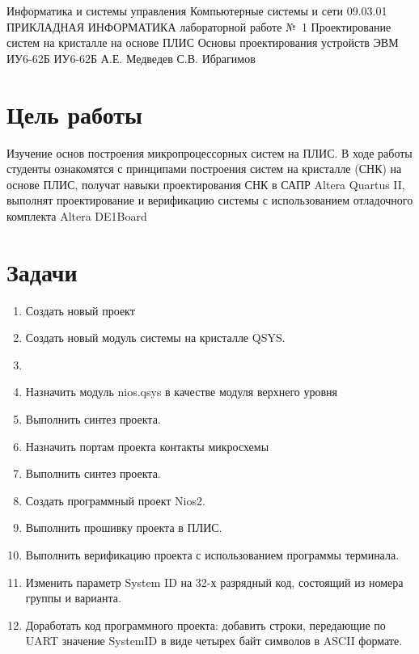 \documentclass{bmstu}
\begin{document}



\makereporttitle
    {Информатика и системы управления} %
    {Компьютерные системы и сети} %
    {09.03.01 ПРИКЛАДНАЯ ИНФОРМАТИКА} %
    {лабораторной работе №~1} %
    {Проектирование систем на кристалле на основе ПЛИС} %
    {Основы проектирования устройств ЭВМ} %
    {} %
    {ИУ6-62Б} %
    {
    	{ИУ6-62Б}
    	{А.Е. Медведев} %
    	{С.В. Ибрагимов} %
    } 

\section*{Цель работы}
Изучение основ построения микропроцессорных систем на ПЛИС. В ходе работы студенты
ознакомятся с принципами построения систем на кристалле (СНК) на основе ПЛИС, получат
навыки проектирования СНК в САПР Altera Quartus II, выполнят проектирование и
верификацию системы с использованием отладочного комплекта Altera DE1Board

\section*{Задачи}
\begin{enumerate}
\item Создать новый проект
\item Создать новый модуль системы на кристалле QSYS.
\item {}
\item Назначить модуль nios.qsys в качестве модуля верхнего уровня
\item Выполнить синтез проекта.
\item Назначить портам проекта контакты микросхемы
\item Выполнить синтез проекта. 
\item Создать программный проект Nios2.
\item Выполнить прошивку проекта в ПЛИС.
\item Выполнить верификацию проекта с использованием программы терминала.
\item Изменить параметр System ID на 32-х разрядный код, состоящий из номера группы и варианта.
\item Доработать код программного проекта: добавить строки, передающие по UART значение SystemID в виде четырех байт символов в ASCII формате.

\end{enumerate}
\end{document}
